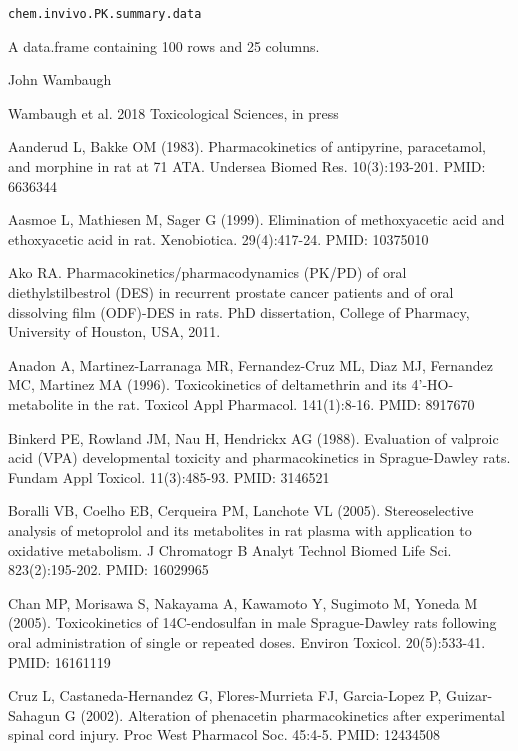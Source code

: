 \documentclass[a4paper]{book}
\begin{document}
%
\begin{Usage}
\begin{verbatim}
chem.invivo.PK.summary.data
\end{verbatim}
\end{Usage}
%
\begin{Format}
A data.frame containing 100 rows and 25 columns.
\end{Format}
%
\begin{Author}\relax
John Wambaugh
\end{Author}
%
\begin{Source}\relax
Wambaugh et al. 2018 Toxicological Sciences, in press
\end{Source}
%
\begin{References}\relax
Aanderud L, Bakke OM (1983). Pharmacokinetics of antipyrine,
paracetamol, and morphine in rat at 71 ATA. Undersea Biomed Res.
10(3):193-201. PMID: 6636344

Aasmoe L, Mathiesen M, Sager G (1999). Elimination of methoxyacetic acid and
ethoxyacetic acid in rat. Xenobiotica. 29(4):417-24. PMID: 10375010

Ako RA. Pharmacokinetics/pharmacodynamics (PK/PD) of oral diethylstilbestrol
(DES) in recurrent prostate cancer patients and of oral dissolving film
(ODF)-DES in rats. PhD dissertation, College of Pharmacy, University of
Houston, USA, 2011.

Anadon A, Martinez-Larranaga MR, Fernandez-Cruz ML, Diaz MJ, Fernandez MC,
Martinez MA (1996). Toxicokinetics of deltamethrin and its 4'-HO-metabolite
in the rat. Toxicol Appl Pharmacol. 141(1):8-16. PMID: 8917670

Binkerd PE, Rowland JM, Nau H, Hendrickx AG (1988). Evaluation of valproic
acid (VPA) developmental toxicity and pharmacokinetics in Sprague-Dawley
rats. Fundam Appl Toxicol. 11(3):485-93. PMID: 3146521

Boralli VB, Coelho EB, Cerqueira PM, Lanchote VL (2005). Stereoselective
analysis of metoprolol and its metabolites in rat plasma with application to
oxidative metabolism. J Chromatogr B Analyt Technol Biomed Life Sci.
823(2):195-202. PMID: 16029965

Chan MP, Morisawa S, Nakayama A, Kawamoto Y, Sugimoto M, Yoneda M (2005).
Toxicokinetics of 14C-endosulfan in male Sprague-Dawley rats following oral
administration of single or repeated doses. Environ Toxicol. 20(5):533-41.
PMID: 16161119

Cruz L, Castaneda-Hernandez G, Flores-Murrieta FJ, Garcia-Lopez P,
Guizar-Sahagun G (2002). Alteration of phenacetin pharmacokinetics after
experimental spinal cord injury. Proc West Pharmacol Soc. 45:4-5. PMID:
12434508


\end{References}
\end{document}
